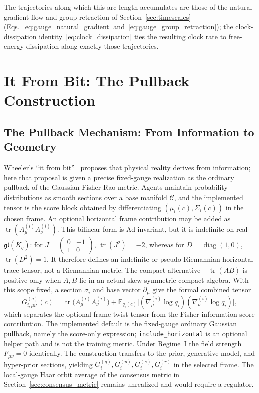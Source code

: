 \documentclass[11pt]{article}
\begin{document}
The trajectories along which this arc length accumulates are those of the natural-gradient flow and group retraction of Section~\ref{sec:timescales} (Eqs.~\eqref{eq:gauge_natural_gradient} and~\eqref{eq:gauge_group_retraction}); the clock-dissipation identity~\eqref{eq:clock_dissipation} ties the resulting clock rate to free-energy dissipation along exactly those trajectories.

\section{It From Bit: The Pullback Construction}\label{sec:it_from_bit}

\subsection{The Pullback Mechanism: From Information to Geometry}
\label{sec:pullback}

Wheeler's ``it from bit''~\cite{Wheeler1990} proposes that physical reality derives from information; here that proposal is given a precise fixed-gauge realization as the ordinary pullback of the Gaussian Fisher-Rao metric. Agents maintain probability distributions as smooth sections over a base manifold $\mathcal{C}$, and the implemented tensor is the score block obtained by differentiating $(\mu_i(c),\Sigma_i(c))$ in the chosen frame. An optional horizontal frame contribution may be added as $\operatorname{tr}(A^{(i)}_\mu A^{(i)}_\nu)$. This bilinear form is Ad-invariant, but it is indefinite on real $\mathfrak{gl}(K_q)$: for $J=\left(\begin{smallmatrix}0&-1\\1&0\end{smallmatrix}\right)$, $\operatorname{tr}(J^2)=-2$, whereas for $D=\operatorname{diag}(1,0)$, $\operatorname{tr}(D^2)=1$. It therefore defines an indefinite or pseudo-Riemannian horizontal trace tensor, not a Riemannian metric. The compact alternative $-\operatorname{tr}(AB)$ is positive only when $A,B$ lie in an actual skew-symmetric compact algebra. With this scope fixed, a section $\sigma_i$ and base vector $\partial_\mu$ give the formal combined tensor
\begin{equation}
\boxed{G^{(q)}_{i,\mu\nu}(c) = \operatorname{tr}\big(A^{(i)}_\mu A^{(i)}_\nu\big) + \mathbb{E}_{q_i(c)}\big[(\nabla^{(i)}_\mu \log q_i)(\nabla^{(i)}_\nu \log q_i)\big],}
\label{eq:induced_metric_full}
\end{equation}
which separates the optional frame-twist tensor from the Fisher-information score contribution. The implemented default is the fixed-gauge ordinary Gaussian pullback, namely the score-only expression; \texttt{include\_horizontal} is an optional helper path and is not the training metric. Under Regime~I the field strength $F_{\mu\nu}=0$ identically. The construction transfers to the prior, generative-model, and hyper-prior sections, yielding $G_i^{(q)},G_i^{(p)},G_i^{(s)},G_i^{(r)}$ in the selected frame. The local-gauge Haar orbit average of the consensus metric in Section~\ref{sec:consensus_metric} remains unrealized and would require a regulator.
\end{document}
